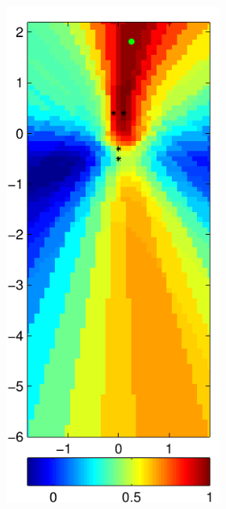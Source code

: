 \documentclass[spanish,openright]{book}
\begin{document}
\begin{figure}
\begin{subfigure}[t]{0.47\textwidth}
\begin{minipage}[t]{\textwidth}
\begin{subfigure}[t]{0.3\textwidth}
\label{fig:Pattern_Fo1500_pos08}
      \end{subfigure}
\begin{subfigure}[t]{0.3\textwidth}
        \includegraphics[width=\textwidth]{SRP_Fo1500_frame1127_pos08}

\end{subfigure}
\end{minipage}
\end{subfigure}
\end{figure}
\end{document}
